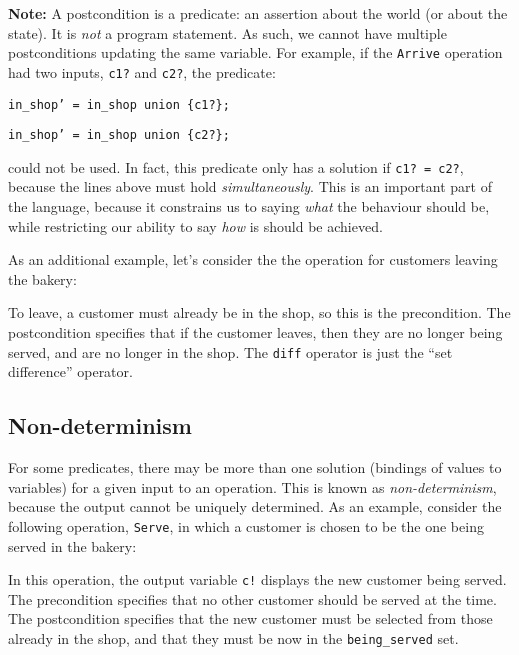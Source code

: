 \textbf{Note:} A postcondition is a predicate: an assertion about the world (or about the state). It is \emph{not} a program statement. As such, we cannot have multiple postconditions updating the same variable. For example, if the \texttt{Arrive} operation had two inputs, \texttt{c1?} and \texttt{c2?}, the predicate:

\quad\quad \texttt{in\_shop' = in\_shop union \{c1?\};}

\vspace{-2mm}

\quad\quad \texttt{in\_shop' = in\_shop union \{c2?\};}

could not be used. In fact, this predicate only has a solution if \texttt{c1? = c2?}, because the lines above must hold \emph{simultaneously}. This is an important part of the language, because it constrains us to saying \emph{what} the behaviour should be, while restricting our ability to say \emph{how} is should be achieved.

\begin{example}
As an additional example, let's consider the the operation for customers leaving the bakery:



To leave, a customer must already be in the shop, so this is the precondition. The postcondition specifies that if the customer leaves, then they are no longer being served, and are no longer in the shop. The \texttt{diff} operator is just the ``set difference'' operator.

\end{example}

\subsection*{Non-determinism}

For some predicates, there may be more than one solution (bindings of values to variables) for a given input to an operation. This is known as \emph{non-determinism}, because the output cannot be uniquely determined. As an example, consider the following operation, \texttt{Serve}, in which a customer is chosen to be the one being served in the bakery:



In this operation, the output variable \texttt{c!} displays the new customer being served. The precondition specifies that no other customer should be served at the time. The postcondition specifies that the new customer must be selected from those already in the shop, and that they must be now in the \texttt{being\_served} set.

